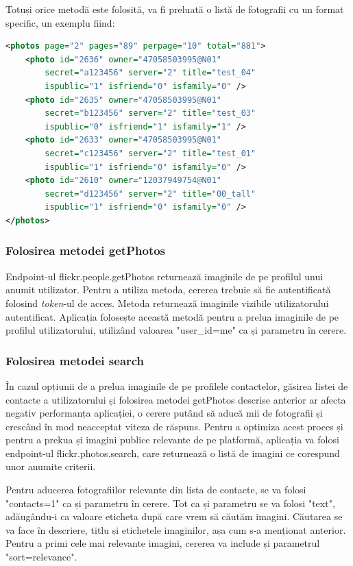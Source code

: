 Totuși orice metodă este folosită, va fi preluată o listă de fotografii cu un format specific, un exemplu fiind:
\begin{lstlisting}[language=XML]
<photos page="2" pages="89" perpage="10" total="881">
	<photo id="2636" owner="47058503995@N01" 
		secret="a123456" server="2" title="test_04"
		ispublic="1" isfriend="0" isfamily="0" />
	<photo id="2635" owner="47058503995@N01"
		secret="b123456" server="2" title="test_03"
		ispublic="0" isfriend="1" isfamily="1" />
	<photo id="2633" owner="47058503995@N01"
		secret="c123456" server="2" title="test_01"
		ispublic="1" isfriend="0" isfamily="0" />
	<photo id="2610" owner="12037949754@N01"
		secret="d123456" server="2" title="00_tall"
		ispublic="1" isfriend="0" isfamily="0" />
</photos>
\end{lstlisting}
\cite{flickr-api}

\subsubsection{Folosirea metodei getPhotos}
Endpoint-ul flickr.people.getPhotos returnează imaginile de pe profilul unui anumit utilizator. Pentru a utiliza metoda, cererea trebuie să fie autentificată folosind \textit{token}-ul de acces. Metoda returnează imaginile vizibile utilizatorului autentificat. Aplicația folosește această metodă pentru a prelua imaginile de pe profilul utilizatorului, utilizând valoarea "user\_id=me" ca și parametru în cerere. 

\subsubsection{Folosirea metodei search}
În cazul opțiunii de a prelua imaginile de pe profilele contactelor, găsirea listei de contacte a utilizatorului și folosirea metodei getPhotos descrise anterior ar afecta negativ performanța aplicației, o cerere putând să aducă mii de fotografii și crescând în mod neacceptat viteza de răspuns.
Pentru a optimiza acest proces și pentru a prekua și imagini publice relevante de pe platformă, aplicația va folosi endpoint-ul flickr.photos.search, care returnează o listă de imagini ce corespund unor anumite criterii.

Pentru aducerea fotografiilor relevante din lista de contacte, se va folosi "contacts=1" ca și parametru în cerere. Tot ca și parametru se va folosi "text", adăugându-i ca valoare eticheta după care vrem să căutăm imagini. Căutarea se va face în descriere, titlu și etichetele imaginilor, așa cum s-a menționat anterior. Pentru a primi cele mai relevante imagini, cererea va include și parametrul "sort=relevance".

